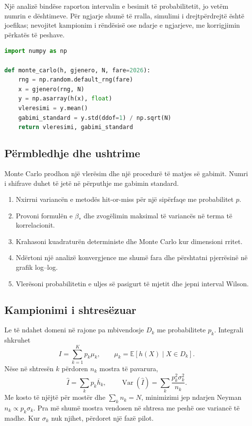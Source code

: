 \documentclass[11pt,oneside,openany]{book}
\newcommand{\E}{\mathbb{E}}
\newcommand{\Var}{\operatorname{Var}}
\begin{document}
Një analizë bindëse raporton intervalin e besimit të probabilitetit, jo vetëm numrin e dështimeve. Për ngjarje shumë të rralla, simulimi i drejtpërdrejtë është joefikas; nevojitet kampionim i rëndësisë ose ndarje e ngjarjeve, me korrigjimin përkatës të peshave.

\begin{lstlisting}[language=Python,caption={Vlerësues Monte Carlo me gabim standard.}]
import numpy as np

def monte_carlo(h, gjenero, N, fare=2026):
    rng = np.random.default_rng(fare)
    x = gjenero(rng, N)
    y = np.asarray(h(x), float)
    vleresimi = y.mean()
    gabimi_standard = y.std(ddof=1) / np.sqrt(N)
    return vleresimi, gabimi_standard
\end{lstlisting}

\subsection{Përmbledhje dhe ushtrime}
Monte Carlo prodhon një vlerësim dhe një procedurë të matjes së gabimit. Numri i shifrave duhet të jetë në përputhje me gabimin standard.
\begin{enumerate}
\item Nxirrni variancën e metodës hit-or-miss për një sipërfaqe me probabilitet $p$.
\item Provoni formulën e $\beta_*$ dhe zvogëlimin maksimal të variancës në terma të korrelacionit.
\item Krahasoni kuadraturën deterministe dhe Monte Carlo kur dimensioni rritet.
\item Ndërtoni një analizë konvergjence me shumë fara dhe përshtatni pjerrësinë në grafik log--log.
\item Vlerësoni probabilitetin e uljes së pasigurt të mjetit dhe jepni interval Wilson.
\end{enumerate}



\subsection{Kampionimi i shtresëzuar}
Le të ndahet domeni në rajone pa mbivendosje $D_k$ me probabilitete $p_k$. Integrali shkruhet
\begin{equation}
 I=\sum_{k=1}^{K}p_k\mu_k,
 \qquad \mu_k=\E[h(X)\mid X\in D_k].
\end{equation}
Nëse në shtresën $k$ përdoren $n_k$ mostra të pavarura,
\begin{equation}
 \widehat I=\sum_kp_k\overline h_k,\qquad
 \Var(\widehat I)=\sum_k\frac{p_k^2\sigma_k^2}{n_k}.
\end{equation}
Me kosto të njëjtë për mostër dhe $\sum_kn_k=N$, minimizimi jep ndarjen Neyman $n_k\propto p_k\sigma_k$. Pra më shumë mostra vendosen në shtresa me peshë ose variancë të madhe. Kur $\sigma_k$ nuk njihet, përdoret një fazë pilot.
\end{document}
